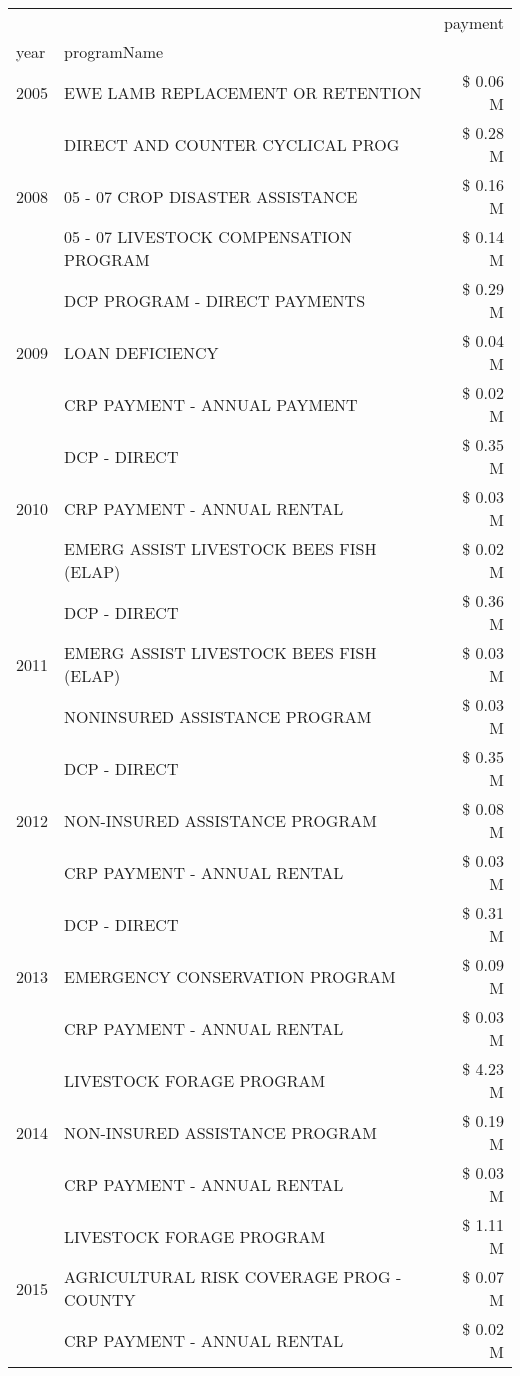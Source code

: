 \begin{tabular}{llr}
\toprule
 &  & payment \\
year & programName &  \\
\midrule
2005 & EWE LAMB REPLACEMENT OR RETENTION & \$ 0.06 M \\
\cline{1-3}
\multirow[t]{3}{*}{2008} & DIRECT AND COUNTER CYCLICAL PROG & \$ 0.28 M \\
 & 05 - 07 CROP DISASTER ASSISTANCE & \$ 0.16 M \\
 & 05 - 07 LIVESTOCK COMPENSATION PROGRAM & \$ 0.14 M \\
\cline{1-3}
\multirow[t]{3}{*}{2009} & DCP PROGRAM - DIRECT PAYMENTS & \$ 0.29 M \\
 & LOAN DEFICIENCY & \$ 0.04 M \\
 & CRP PAYMENT - ANNUAL PAYMENT & \$ 0.02 M \\
\cline{1-3}
\multirow[t]{3}{*}{2010} & DCP - DIRECT & \$ 0.35 M \\
 & CRP PAYMENT - ANNUAL RENTAL & \$ 0.03 M \\
 & EMERG ASSIST LIVESTOCK BEES FISH (ELAP) & \$ 0.02 M \\
\cline{1-3}
\multirow[t]{3}{*}{2011} & DCP - DIRECT & \$ 0.36 M \\
 & EMERG ASSIST LIVESTOCK BEES FISH (ELAP) & \$ 0.03 M \\
 & NONINSURED ASSISTANCE PROGRAM & \$ 0.03 M \\
\cline{1-3}
\multirow[t]{3}{*}{2012} & DCP - DIRECT & \$ 0.35 M \\
 & NON-INSURED ASSISTANCE PROGRAM & \$ 0.08 M \\
 & CRP PAYMENT - ANNUAL RENTAL & \$ 0.03 M \\
\cline{1-3}
\multirow[t]{3}{*}{2013} & DCP - DIRECT & \$ 0.31 M \\
 & EMERGENCY CONSERVATION PROGRAM & \$ 0.09 M \\
 & CRP PAYMENT - ANNUAL RENTAL & \$ 0.03 M \\
\cline{1-3}
\multirow[t]{3}{*}{2014} & LIVESTOCK FORAGE PROGRAM & \$ 4.23 M \\
 & NON-INSURED ASSISTANCE PROGRAM & \$ 0.19 M \\
 & CRP PAYMENT - ANNUAL RENTAL & \$ 0.03 M \\
\cline{1-3}
\multirow[t]{3}{*}{2015} & LIVESTOCK FORAGE PROGRAM & \$ 1.11 M \\
 & AGRICULTURAL RISK COVERAGE PROG - COUNTY & \$ 0.07 M \\
 & CRP PAYMENT - ANNUAL RENTAL & \$ 0.02 M \\

\end{tabular}
